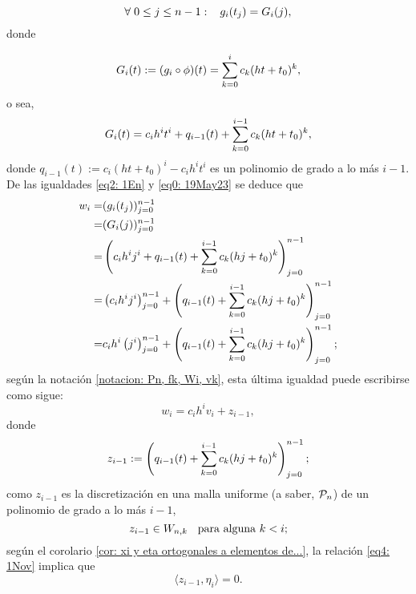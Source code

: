 \begin{itemize}
\begin{equation}
\label{eq2: 1En}
\forall \hspace{0.1cm} 0 \leq j \leq n-1: \hspace{0.3cm} g_{i}(t_{j})= G_{i}(j),
\end{equation}
donde

\[
G_{i}(t):= (g_{i} \circ \phi)(t) =
\sum\limits_{k=0}^{i}c_{k}(ht+t_{0})^{k},
\]
o sea, 
\begin{equation}
\label{eq0: 19May23}
G_{i}(t) = c_{i}h^{i}t^{i}+ q_{i-1}(t) +
\sum\limits_{k=0}^{i-1}c_{k}(ht+t_{0})^{k},
\end{equation}
donde $q_{i-1}(t) := c_{i}(ht+t_{0})^{i}- c_{i}h^{i}t^{i}$
es un polinomio de grado a lo más $i-1$.
De las igualdades \eqref{eq2: 1En} y 
\eqref{eq0: 19May23} se deduce que
\begin{align*}
w_{i}= & (g_{i}(t_{j}))_{j=0}^{n-1} \\ 
= & (G_{i}(j))_{j=0}^{n-1} \\
= & \left( c_{i}h^{i}j^{i}+ q_{i-1}(t) +
 \sum\limits_{k=0}^{i-1}c_{k}(hj+t_{0})^{k}\right)_{j=0}^{n-1}\\
 = & \left(c_{i}h^{i}j^{i}\right)_{j=0}^{n-1}
 +\left( q_{i-1}(t) + \sum\limits_{k=0}^{i-1}c_{k}(hj+t_{0})^{k}\right)_{j=0}^{n-1} \\
  = & c_{i}h^{i}\left(j^{i}\right)_{j=0}^{n-1}
 +\left(q_{i-1}(t) + \sum\limits_{k=0}^{i-1}c_{k}(hj+t_{0})^{k}\right)_{j=0}^{n-1};
\end{align*}
según la notación \ref{notacion: Pn, fk, Wi, vk}, esta
última igualdad puede escribirse como sigue:
\begin{equation}
\label{eq6: 1Nov}
w_{i}= c_{i}h^{i} v_{i}+ z_{i-1},
\end{equation}
donde 
\begin{equation*}
z_{i-1}:=\left(q_{i-1}(t) + \sum\limits_{k=0}^{i-1}c_{k}(hj+t_{0})^{k}\right)_{j=0}^{n-1};
\end{equation*}
como $z_{i-1}$ es la discretización en una malla uniforme
(a saber, $\mathcal{P}_{n}$) de un polinomio de grado a lo más $i-1$, 
\begin{equation}
\label{eq4: 1Nov}
z_{i-1} \in W_{n,k} \hspace{0.2cm} \text{ para alguna } k < i;
\end{equation}
según el corolario \ref{cor: xi y eta ortogonales a elementos de...},
la relación \eqref{eq4: 1Nov} implica que
\begin{equation}
\label{eq5: 1Nov}
\langle z_{i-1}, \eta_{i} \rangle =0.
\end{equation}


\end{itemize}
